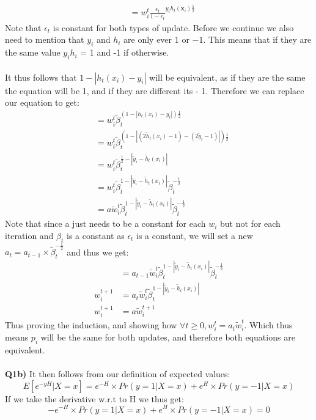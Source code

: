 \documentclass{article}
\begin{document}
\begin{titlepage}
\begin{align*}
&= w_i^t \frac{\epsilon_t}{1-\epsilon_t}^{y_ih_t(\textbf{x}_i)\frac{1}{2}} 
\end{align*}
\newpage
Note that $\epsilon_t$ is constant for both types of update. Before we continue we also need to mention that $y_i$ and $h_i$ are only ever $1$ or $-1$. This means that if they are the same value $y_ih_i$ = 1 and -1 if otherwise. \\\\
It thus follows that $1- | h_t(x_i) -y_i|$ will be equivalent, as if they are the same the equation will be 1, and if they are different its - 1. Therefore we can replace our equation to get:
\begin{align*}
&= w_i^t \widetilde{\beta}_t^{(1- | h_t(x_i) - y_i |)\frac{1}{2}} \\ 
&= w_i^t \widetilde{\beta}_t^{(1- | (2\widetilde{h}_t(x_i)  -1) - (2\widetilde{y}_i - 1)|)\frac{1}{2}}  \\
&= w_i^t \widetilde{\beta}_t^{\frac{1}{2} -|\widetilde{y}_i - \widetilde{h}_t(x_i)|}\\
&= w_i^t \widetilde{\beta}_t^{1 -|\widetilde{y}_i - \widetilde{h}_t(x_i)|}\widetilde{\beta}_t^{-\frac{1}{2}} \\
&= a \widetilde{w}_i^t \widetilde{\beta}_t^{1 -|\widetilde{y}_i - \widetilde{h}_t(x_i)|}\widetilde{\beta}_t^{-\frac{1}{2}}
\end{align*}
Note that since a just needs to be a constant for each $w_i$ but not for each iteration and $\beta_t$ is a constant as $\epsilon_t$ is a constant, we will set a new $a_t = a_{t-1}\times\widetilde{\beta}_t^{-\frac{1}{2}}$ and thus we get:
\begin{align*}
&= a_{t-1} \widetilde{w}_i^t \widetilde{\beta}_t^{1 -|\widetilde{y}_i - \widetilde{h}_t(x_i)|}\widetilde{\beta}_t^{-\frac{1}{2}} \\
w_i^{t+1}&= a_t \widetilde{w}_i^{t} \widetilde{\beta}_t^{1 -|\widetilde{y}_i - \widetilde{h}_t(x_i)|} \\
w_i^{t+1}&= a \widetilde{w}_i^{t+1}
\end{align*}
Thus proving the induction, and showing how $\forall t \geq 0, w_i^{t} = a_t \widetilde{w}_i^{t}$. Which thus means $p_i$ will be the same for both updates, and therefore both equations are equivalent.\\\\
\textbf{Q1b)} It then follows from our definition of expected values:
\[ E[e^{-yH} |X=x]  = e^{-H}\times Pr(y=1 | X=x) + e^{H}\times Pr(y=-1 | X=x) \]
If we take the derivative w.r.t to H we thus get:
\[ -e^{-H}\times Pr(y=1 | X=x) + e^{H}\times Pr(y=-1 | X=x) = 0 \]

\end{titlepage}
\end{document}

